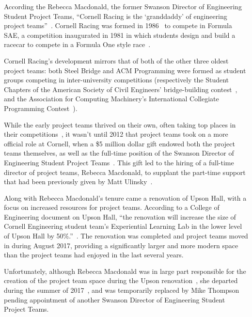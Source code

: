 \documentclass[12pt]{article}
\begin{document}
According the Rebecca Macdonald, the former Swanson Director of Engineering Student Project Teams, ``Cornell Racing is the `granddaddy' of engineering project teams''~\cite{klein_engineering_2015}. Cornell Racing was formed in 1986~\cite{noauthor_cornell_2012} to compete in Formula SAE, a competition inaugurated in 1981 in which students design and build a racecar to compete in a Formula One style race~\cite{sae_international_formula_2018}.

Cornell Racing's development mirrors that of both of the other three oldest project teams: both Steel Bridge and ACM Programming were formed as student groups competing in inter-university competitions (respectively the Student Chapters of the American Society of Civil Engineers' bridge-building contest~\cite{robert_e._shaw_jr._bridging_1988}, and the Association for Computing Machinery's International Collegiate Programming Contest~\cite{poucher_early_2011}).

While the early project teams thrived on their own, often taking top places in their competitions~\cite{noauthor_cuauv_2003}, it wasn't until 2012 that project teams took on a more official role at Cornell, when a \$5 million dollar gift endowed both the project teams themselves, as well as the full-time position of the Swanson Director of Engineering Student Project Teams~\cite{emily_hopkins_10_2012}.
This gift led to the hiring of a full-time director of project teams, Rebecca Macdonald, to supplant the part-time support that had been previously given by Matt Ulinsky~\cite{thomas_putting_2013}.

Along with Rebecca Macdonald's tenure came a renovation of Upson Hall, with a focus on increased resources for project teams.
According to a College of Engineering document on Upson Hall, ``the renovation will increase the size of Cornell Engineering student team's Experiential Learning Lab in the lower level of Upson Hall by 50\%.''~\cite{noauthor_cornell_2015-1}.
The renovation was completed and project teams moved in during August 2017, providing a significantly larger and more modern space than the project teams had enjoyed in the last several years.

Unfortunately, although Rebecca Macdonald was in large part responsible for the creation of the project team space during the Upson renovation~\cite{noauthor_q&rebecca_2014}, she departed during the summer of 2017~\cite{macdonald_thank_2017}, and was temporarily replaced by Mike Thompson~\cite{ivory_thank_2017} pending appointment of another Swanson Director of Engineering Student Project Teams.
\end{document}
